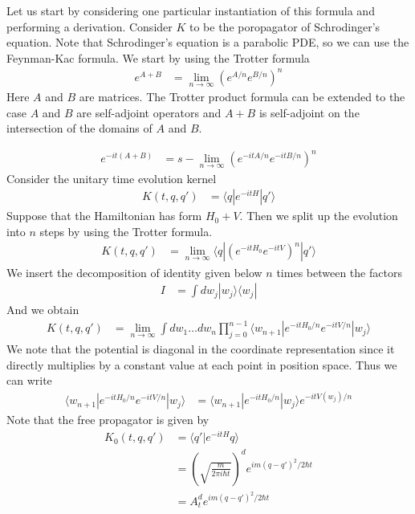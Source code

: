 \documentclass[book.tex]{subfiles}
\begin{document}
Let us start by considering one particular instantiation of this formula and performing a derivation. Consider $K$ to be the poropagator of Schrodinger's equation. Note that Schrodinger's equation is a parabolic PDE, so we can use the Feynman-Kac formula. We start by using the Trotter formula
\begin{align}
    e^{A+B} &= \lim_{n\to\infty} (e^{A/n}e^{B/n})^n
\end{align}
Here $A$ and $B$ are matrices. The Trotter product formula can be extended to the case $A$ and $B$ are self-adjoint operators and $A+B$ is self-adjoint on the intersection of the domains of $A$ and $B$.

\begin{align}
    e^{-it(A+B)} &= s - \lim_{n\to\infty} \left (e^{-itA/n}e^{-itB/n}\right )^n
\end{align}
Consider the unitary time evolution kernel
\begin{align}
    K(t, q, q') &= \langle q | e^{-itH}|q'\rangle 
\end{align}
Suppose that the Hamiltonian has form $H_0 + V$. Then
we split up the evolution into $n$ steps  by using the Trotter formula.
\begin{align}
    K(t, q, q') &= \lim_{n\to\infty} \langle q | \left (e^{-itH_0}e^{-itV} \right )^n|q'\rangle 
\end{align}
We insert the decomposition of identity given below $n$ times between the factors
\begin{align}
    I &= \int dw_j |w_j\rangle \langle w_j |
\end{align}
And we obtain
\begin{align}
    K(t,q,q') &= \lim_{n\to\infty} \int dw_1 \dotsc dw_n \prod_{j=0}^{n-1} \langle w_{n+1} | e^{-itH_0/n}e^{-itV/n}|w_j\rangle
\end{align}
We note that the potential is diagonal in the coordinate representation since it directly multiplies by a constant value at each point in position space. Thus we can write
\begin{align}
    \langle w_{n+1} | e^{-itH_0/n}e^{-itV/n}|w_j\rangle &= \langle w_{n+1} | e^{-itH_0/n}|w_j\rangle e^{-itV(w_j)/n}
\end{align}
Note that the free propagator is given by
\begin{align}
    K_0(t, q, q') &= \langle q' | e^{-itH} q \rangle \\
    &= \left(\sqrt{\frac{m}{2\pi i \hbar t}}\right)^d e^{im(q-q')^2/2\hbar t} \\
    &= A_t^d e^{im(q-q')^2/2\hbar t}
\end{align}
\end{document}
